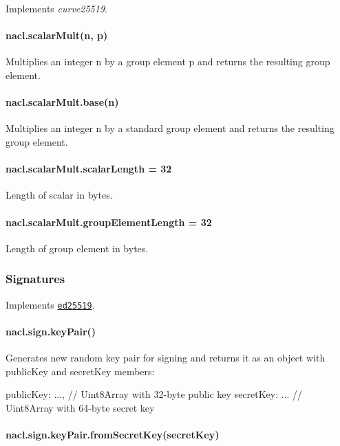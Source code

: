 Implements {\itshape curve25519}.

\paragraph*{nacl.\+scalar\+Mult(n, p)}

Multiplies an integer {\ttfamily n} by a group element {\ttfamily p} and returns the resulting group element.

\paragraph*{nacl.\+scalar\+Mult.\+base(n)}

Multiplies an integer {\ttfamily n} by a standard group element and returns the resulting group element.

\paragraph*{nacl.\+scalar\+Mult.\+scalar\+Length = 32}

Length of scalar in bytes.

\paragraph*{nacl.\+scalar\+Mult.\+group\+Element\+Length = 32}

Length of group element in bytes.

\subsubsection*{Signatures}

Implements \href{http://ed25519.cr.yp.to}{\tt ed25519}.

\paragraph*{nacl.\+sign.\+key\+Pair()}

Generates new random key pair for signing and returns it as an object with {\ttfamily public\+Key} and {\ttfamily secret\+Key} members\+: \begin{DoxyVerb}{
   publicKey: ...,  // Uint8Array with 32-byte public key
   secretKey: ...   // Uint8Array with 64-byte secret key
}
\end{DoxyVerb}


\paragraph*{nacl.\+sign.\+key\+Pair.\+from\+Secret\+Key(secret\+Key)}

